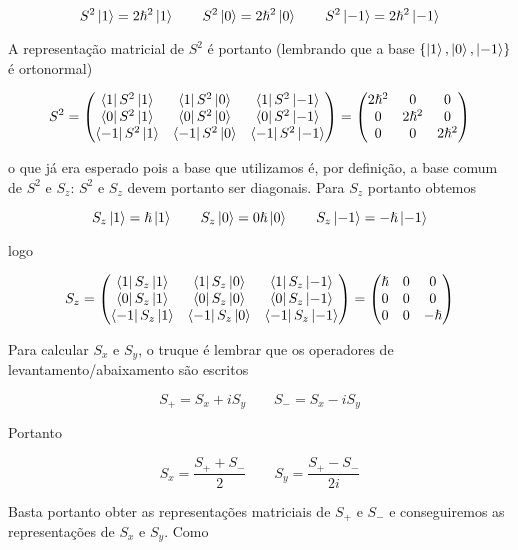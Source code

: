 \documentclass[a4paper, 12pt, notitlepage]{article}
\begin{document}
\begin{enumerate}
\[
S^2 \ket{1} = 2 \hslash^2 \ket{1} \qquad S^2 \ket{0} = 2\hslash^2 \ket{0} \qquad S^2 \ket{-1} = 2\hslash^2 \ket{-1}
\]

A representação matricial de $S^2$ é portanto (lembrando que a base $\{\ket{1}, \ket{0}, \ket{-1}\}$ é ortonormal)

\[
S^2 = \begin{pmatrix} 
  \bra{1} S^2 \ket{1} & \bra{1} S^2 \ket{0} & \bra{1} S^2 \ket{-1} \\
  \bra{0} S^2 \ket{1} & \bra{0} S^2 \ket{0} & \bra{0} S^2 \ket{-1} \\
  \bra{-1} S^2 \ket{1} & \bra{-1} S^2 \ket{0} & \bra{-1} S^2 \ket{-1}
\end{pmatrix}
=
\begin{pmatrix}
  2 \hslash^2 & 0 & 0 \\
  0 & 2\hslash^2 & 0 \\
  0 & 0 & 2\hslash^2
\end{pmatrix}
\]

\noindent o que já era esperado pois a base que utilizamos é, por definição, a base comum de $S^2$ e $S_z$: $S^2$ e $S_z$ devem portanto ser diagonais. Para $S_z$ portanto obtemos

\[ 
S_z\ket{1} = \hslash \ket{1} \qquad S_z \ket{0} = 0\hslash \ket{0} \qquad S_z \ket{-1} = -\hslash \ket{-1} 
\]

\noindent logo

\[
S_z = \begin{pmatrix}
  \bra{1} S_z \ket{1} & \bra{1} S_z \ket{0} & \bra{1} S_z \ket{-1} \\
  \bra{0} S_z \ket{1} & \bra{0} S_z \ket{0} & \bra{0} S_z \ket{-1} \\
  \bra{-1} S_z \ket{1} & \bra{-1} S_z \ket{0} & \bra{-1} S_z \ket{-1}
\end{pmatrix}
= 
\begin{pmatrix}
  \hslash & 0 & 0 \\
  0 & 0 & 0 \\
  0 & 0 & -\hslash
\end{pmatrix}
\]

Para calcular $S_x$ e $S_y$, o truque é lembrar que os operadores de levantamento/abaixamento são escritos

\[ S_+ = S_x + iS_y \qquad S_- = S_x - iS_y \]

Portanto

\[ S_x = \frac{S_+ + S_-}{2} \qquad S_y = \frac{S_+ - S_-}{2i}\]

Basta portanto obter as representações matriciais de $S_+$ e $S_-$ e conseguiremos as representações de $S_x$ e $S_y$. Como


\end{enumerate}
\end{document}
